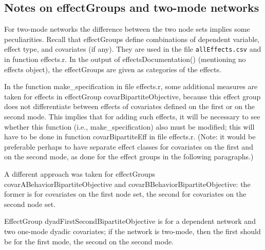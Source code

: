 \documentclass[a4paper,fleqn,11pt]{article}
\newcommand{\+}{\, + \,}
\newcommand{\sfn}[1]{\textsf{#1}}
\begin{document}
\subsection{Notes on effectGroups and two-mode networks}
\label{S_notestwomode}

For two-mode networks the difference between the two node sets implies
some peculiarities.
Recall that effectGroups define combinations of dependent variable,
effect type, and covariates (if any).
They are used in the file \texttt{allEffects.csv}
and in function \sfn{effects.r}.
In the output of \sfn{effectsDocumentation()}
(mentioning no effects object), the effectGroups are
given as categories of the effects.

In the function \textsf{make\_specification} in file \sfn{effects.r},
some additional
measures are taken for effects in effectGroup \sfn{covarBipartiteObjective},
because this effect group does not differentiate between effects of covariates
defined on the first or on the second mode.
This implies that for adding such effects, it will be necessary to see whether
this function (i.e., \textsf{make\_specification}) also must be modified;
this will have to be done
in function \sfn{covarBipartiteEff} in file \sfn{effects.r}.
(Note: it would be preferable perhaps to have separate effect classes
for covariates on the first and on the second mode, as done for the effect
groups in the following paragraphs.)

A different approach was taken for effectGroups
\sfn{covarABehaviorBipartiteObjective} and \sfn{covarBBehaviorBipartiteObjective}:
the former is for covariates on the first node set, the second for
covariates on the second node set.

EffectGroup \sfn{dyadFirstSecondBipartiteObjective} is for a dependent network
and two one-mode dyadic covariates; if the network is two-mode, then the first
should be for the first mode, the second on the second mode.
\end{document}

